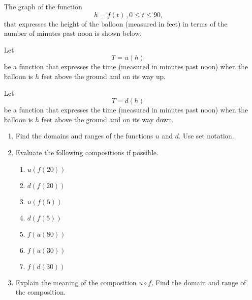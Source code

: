 \documentclass{ximera}
\begin{document}
\begin{exploration} \label{E4:Quadratics}
The graph of the function 
\[
\   h=f(t) \, , 0\leq t \leq 90, 
\]
that expresses the height of the balloon (measured in feet) in terms of the number of minutes past noon is shown below. 

 
\begin{onlineOnly}
    \begin{center}
\end{center}
\end{onlineOnly}


Let 
\[
    T = u(h)
\]
be a function that expresses the time (measured in minutes past noon) when the balloon is $h$ feet above the ground and on its way up.

Let 
\[
    T = d(h)
\]
be a function that expresses the time (measured in minutes past noon) when the balloon is $h$ feet above the ground and on its way down.

\begin{enumerate}

\item Find the domains and ranges of the functions $u$ and $d$. Use set notation.

\item Evaluate the following compositions if possible.

\begin{enumerate}
\item $u(f(20))$

\item $d(f(20))$

\item $u(f(5))$

\item $d(f(5))$

\item $f(u(80))$

\item $f(u(30))$

\item $f(d(30))$

\end{enumerate}

\item Explain the meaning of the composition $u\circ f$. Find the domain and range of the composition.


\end{enumerate}
\end{exploration}
\end{document}
